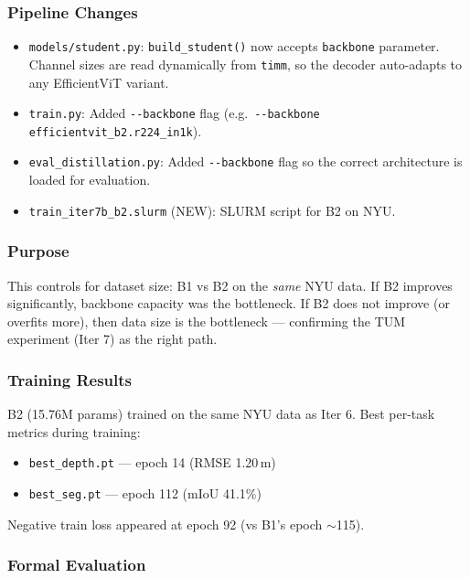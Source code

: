 \documentclass[11pt,a4paper]{article}
\begin{document}
\subsubsection{Pipeline Changes}

\begin{itemize}[nosep]
  \item \texttt{models/student.py}: \texttt{build\_student()} now accepts
    \texttt{backbone} parameter. Channel sizes are read dynamically from
    \texttt{timm}, so the decoder auto-adapts to any EfficientViT variant.
  \item \texttt{train.py}: Added \texttt{-{}-backbone} flag (e.g.\
    \texttt{-{}-backbone efficientvit\_b2.r224\_in1k}).
  \item \texttt{eval\_distillation.py}: Added \texttt{-{}-backbone} flag
    so the correct architecture is loaded for evaluation.
  \item \texttt{train\_iter7b\_b2.slurm} (NEW): SLURM script for B2 on NYU.
\end{itemize}

\subsubsection{Purpose}

This controls for dataset size: B1 vs B2 on the \emph{same} NYU data.
If B2 improves significantly, backbone capacity was the bottleneck.
If B2 does not improve (or overfits more), then data size is the
bottleneck --- confirming the TUM experiment (Iter 7) as the right path.

\subsubsection{Training Results}

B2 (15.76M params) trained on the same NYU data as Iter 6.
Best per-task metrics during training:
\begin{itemize}[nosep]
  \item \texttt{best\_depth.pt} --- epoch 14 (RMSE 1.20\,m)
  \item \texttt{best\_seg.pt} --- epoch 112 (mIoU 41.1\%)
\end{itemize}

Negative train loss appeared at epoch 92 (vs B1's epoch $\sim$115).

\subsubsection{Formal Evaluation}
\end{document}
